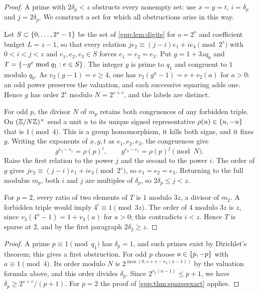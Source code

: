 \begin{proof}
A prime with $2\delta_p<z$ obstructs every nonempty set: use $x=y=t$, $i=\delta_p$ and
$j=2\delta_p$. We construct a set for which all obstructions arise in this way.

Let $S\subset\{0,\ldots,2^s-1\}$ be the set of \cref{gpp:lem:digits} for $o=2^s$ and
coefficient budget $L=z-1$, so that every relation
$je_2\equiv(j-i)e_1+ie_3\pmod{2^s}$ with $0<i<j<z$ and $e_1,e_2,e_3\in S$ forces
$e_1=e_2=e_3$. Put $g=1+3zq_0$ and $T=\{-g^e\bmod q_1:e\in S\}$. The integer $g$ is
prime to $q_1$ and congruent to $1$ modulo $q_0$. As $v_2(g-1)=v\ge4$, one has
$v_2(g^a-1)=v+v_2(a)$ for $a>0$: an odd power preserves the valuation, and each
successive squaring adds one. Hence $g$ has order $2^s$ modulo $N=2^{s+v}$, and the
labels are distinct.

For odd $p$, the divisor $N$ of $m_p$ retains both congruences of any forbidden triple.
On $(\mathbb{Z}/N\mathbb{Z})^\times$ send a unit $u$ to its unique signed representative
$\rho(u)\in\{u,-u\}$ that is $1\pmod4$. This is a group homomorphism, it kills both
signs, and it fixes $g$. Writing the exponents of $x,y,t$ as $e_1,e_2,e_3$, the
congruences give
\[
 g^{e_2-e_1}=\rho(p)^i,\qquad g^{e_3-e_1}=\rho(p)^j\pmod N .
\]
Raise the first relation to the power $j$ and the second to the power $i$. The order of
$g$ gives $je_2\equiv(j-i)e_1+ie_3\pmod{2^s}$, so $e_1=e_2=e_3$. Returning to the full
modulus $m_p$, both $i$ and $j$ are multiples of $\delta_p$, so $2\delta_p\le j<z$.

For $p=2$, every ratio of two elements of $T$ is $1$ modulo $3z$, a divisor of $m_2$. A
forbidden triple would imply $4^i\equiv1\pmod{3z}$. The order of $4$ modulo $3z$ is $z$,
since $v_3(4^a-1)=1+v_3(a)$ for $a>0$; this contradicts $i<z$. Hence $T$ is sparse at
$2$, and by the first paragraph $2\delta_2\ge z$.
\end{proof}


\begin{proof}
A prime $p\equiv1\pmod{q_1}$ has $\delta_p=1$, and such primes exist by Dirichlet's
theorem; this gives a first obstruction. For odd $p$ choose $a\in\{p,-p\}$ with
$a\equiv1\pmod4$. Its order modulo $N$ is $2^{\max(0,s+v-v_2(a-1))}$ by the valuation
formula above, and this order divides $\delta_p$. Since $2^{v_2(a-1)}\le p+1$, we have
$\delta_p\ge2^{s+v}/(p+1)$. For $p=2$ the proof of \cref{gpp:thm:sparseexact} applies.
\end{proof}

